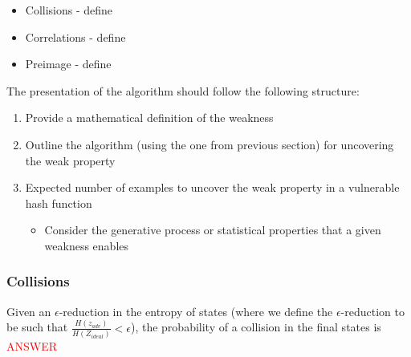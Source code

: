 \begin{itemize}
\item Collisions - define
\item Correlations - define
\item Preimage - define
\end{itemize}


The presentation of the algorithm should follow the following structure:
\begin{enumerate}
\item Provide a mathematical definition of the weakness
\item Outline the algorithm (using the one from previous section) for uncovering the weak property
\item Expected number of examples to uncover the weak property in a vulnerable hash function
\begin{itemize}
\item Consider the generative process or statistical properties that a given weakness enables
\end{itemize}
\end{enumerate}

\subsubsection{Collisions}
\begin{theorem}
Given an $\epsilon$-reduction in the entropy of states (where we define the $\epsilon$-reduction to be such that $\frac{H(z_{adv})}{H(Z_{ideal})} < \epsilon$), the probability of a collision in the final states is \textcolor{red}{ANSWER}
\end{theorem}

